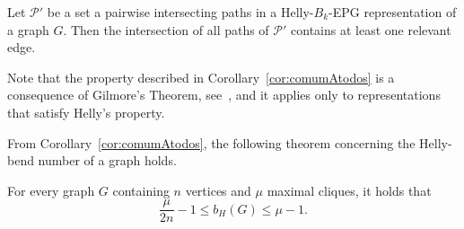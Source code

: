 
\begin{corollary}\label{cor:comumAtodos}
Let ${\mathcal P'}$ be a set a pairwise intersecting paths in a Helly-$B_k$-EPG representation of a graph $G$. Then the intersection of all paths of  ${\mathcal P'}$ contains at least one relevant edge.
\end{corollary}

Note that the property described in Corollary~\ref{cor:comumAtodos} is a consequence of Gilmore's Theorem, see~\cite{bergeDuchet1975}, and it applies only to representations that satisfy Helly's property.

From Corollary~\ref{cor:comumAtodos}, the following theorem concerning the Helly-bend number of a graph holds.

\begin{theorem}\label{teo:lowerboundCliques}
For every graph $G$ containing $n$ vertices and $\mu$ maximal cliques, it holds that $$\frac{\mu}{2n}-1\leq b_H(G)\leq \mu -1.$$ 
\end{theorem}


